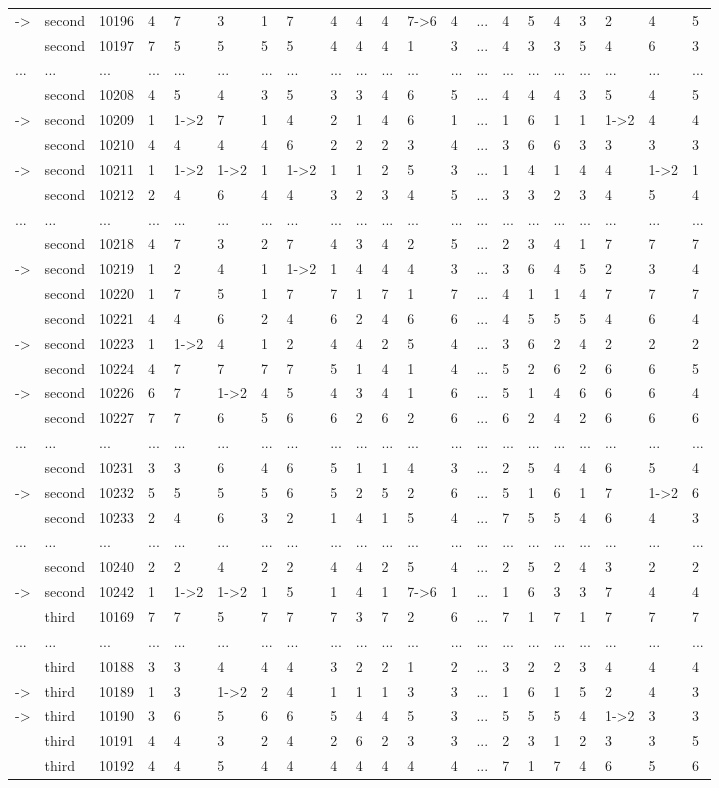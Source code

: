 \begin{landscape}
{\begin{longtable}{lllllllllllllllllllll}
-\textgreater &second&10196&4&7&3&1&7&4&4&4&7-\textgreater 6&4&...&4&5&4&3&2&4&5\tabularnewline
&second&10197&7&5&5&5&5&4&4&4&1&3&...&4&3&3&5&4&6&3\tabularnewline
...&...&...&...&...&...&...&...&...&...&...&...&...&...&...&...&...&...&...&...&...\tabularnewline
&second&10208&4&5&4&3&5&3&3&4&6&5&...&4&4&4&3&5&4&5\tabularnewline
-\textgreater &second&10209&1&1-\textgreater 2&7&1&4&2&1&4&6&1&...&1&6&1&1&1-\textgreater 2&4&4\tabularnewline
&second&10210&4&4&4&4&6&2&2&2&3&4&...&3&6&6&3&3&3&3\tabularnewline
-\textgreater &second&10211&1&1-\textgreater 2&1-\textgreater 2&1&1-\textgreater 2&1&1&2&5&3&...&1&4&1&4&4&1-\textgreater 2&1\tabularnewline
&second&10212&2&4&6&4&4&3&2&3&4&5&...&3&3&2&3&4&5&4\tabularnewline
...&...&...&...&...&...&...&...&...&...&...&...&...&...&...&...&...&...&...&...&...\tabularnewline
&second&10218&4&7&3&2&7&4&3&4&2&5&...&2&3&4&1&7&7&7\tabularnewline
-\textgreater &second&10219&1&2&4&1&1-\textgreater 2&1&4&4&4&3&...&3&6&4&5&2&3&4\tabularnewline
&second&10220&1&7&5&1&7&7&1&7&1&7&...&4&1&1&4&7&7&7\tabularnewline
&second&10221&4&4&6&2&4&6&2&4&6&6&...&4&5&5&5&4&6&4\tabularnewline
-\textgreater &second&10223&1&1-\textgreater 2&4&1&2&4&4&2&5&4&...&3&6&2&4&2&2&2\tabularnewline
&second&10224&4&7&7&7&7&5&1&4&1&4&...&5&2&6&2&6&6&5\tabularnewline
-\textgreater &second&10226&6&7&1-\textgreater 2&4&5&4&3&4&1&6&...&5&1&4&6&6&6&4\tabularnewline
&second&10227&7&7&6&5&6&6&2&6&2&6&...&6&2&4&2&6&6&6\tabularnewline
...&...&...&...&...&...&...&...&...&...&...&...&...&...&...&...&...&...&...&...&...\tabularnewline
&second&10231&3&3&6&4&6&5&1&1&4&3&...&2&5&4&4&6&5&4\tabularnewline
-\textgreater &second&10232&5&5&5&5&6&5&2&5&2&6&...&5&1&6&1&7&1-\textgreater 2&6\tabularnewline
&second&10233&2&4&6&3&2&1&4&1&5&4&...&7&5&5&4&6&4&3\tabularnewline
...&...&...&...&...&...&...&...&...&...&...&...&...&...&...&...&...&...&...&...&...\tabularnewline
&second&10240&2&2&4&2&2&4&4&2&5&4&...&2&5&2&4&3&2&2\tabularnewline
-\textgreater &second&10242&1&1-\textgreater 2&1-\textgreater 2&1&5&1&4&1&7-\textgreater 6&1&...&1&6&3&3&7&4&4\tabularnewline
&third&10169&7&7&5&7&7&7&3&7&2&6&...&7&1&7&1&7&7&7\tabularnewline
...&...&...&...&...&...&...&...&...&...&...&...&...&...&...&...&...&...&...&...&...\tabularnewline
&third&10188&3&3&4&4&4&3&2&2&1&2&...&3&2&2&3&4&4&4\tabularnewline
-\textgreater &third&10189&1&3&1-\textgreater 2&2&4&1&1&1&3&3&...&1&6&1&5&2&4&3\tabularnewline
\newpage
-\textgreater &third&10190&3&6&5&6&6&5&4&4&5&3&...&5&5&5&4&1-\textgreater 2&3&3\tabularnewline
&third&10191&4&4&3&2&4&2&6&2&3&3&...&2&3&1&2&3&3&5\tabularnewline
&third&10192&4&4&5&4&4&4&4&4&4&4&...&7&1&7&4&6&5&6\tabularnewline

\end{longtable}}
\end{landscape}
